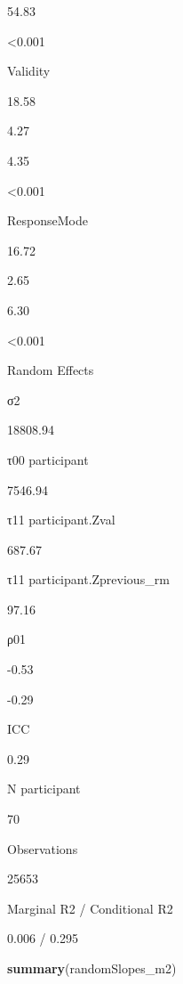 \documentclass[
]{article}
\newenvironment{Shaded}{\begin{snugshade}}{\end{snugshade}}
\newcommand{\KeywordTok}[1]{\textcolor[rgb]{0.13,0.29,0.53}{\textbf{#1}}}
\newcommand{\NormalTok}[1]{#1}
\begin{document}
54.83

\textless0.001

Validity

18.58

4.27

4.35

\textless0.001

ResponseMode

16.72

2.65

6.30

\textless0.001

Random Effects

σ2

18808.94

τ00 participant

7546.94

τ11 participant.Zval

687.67

τ11 participant.Zprevious\_rm

97.16

ρ01

-0.53

-0.29

ICC

0.29

N participant

70

Observations

25653

Marginal R2 / Conditional R2

0.006 / 0.295

\begin{Shaded}
\begin{Highlighting}[]
\KeywordTok{summary}\NormalTok{(randomSlopes_m2)}
\end{Highlighting}
\end{Shaded}
\end{document}
